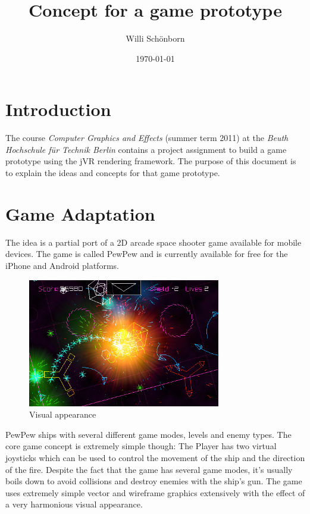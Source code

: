 \documentclass[a4paper]{article}
\title{Concept for a game prototype}
\author{Willi Schönborn}
\date{\today}
\begin{document}
\maketitle

\section*{Introduction}
The course \textit{Computer Graphics and Effects} (summer term 2011) at the \textit{Beuth Hochschule für Technik Berlin} contains a project assignment to build a game prototype using the jVR rendering framework. The purpose of this document is to explain the ideas and concepts for that game prototype.

\section*{Game Adaptation}
The idea is a partial port of a 2D arcade space shooter game available for mobile devices. The game is called PewPew and is currently available for free for the iPhone and Android platforms.

\begin{figure}[htbp]
\centering
\includegraphics[width=0.75\textwidth]{PewPew-iPhone-App-Review.jpg}
\caption{Visual appearance}
\end{figure}

PewPew ships with several different game modes, levels and enemy types. The core game concept is extremely simple though: The Player has two virtual joysticks which can be used to control the movement of the ship and the direction of the fire. Despite the fact that the game has several game modes, it's usually boils down to avoid collisions and destroy enemies with the ship's gun. The game uses extremely simple vector and wireframe graphics extensively with the effect of a very harmonious visual appearance.
\end{document}
